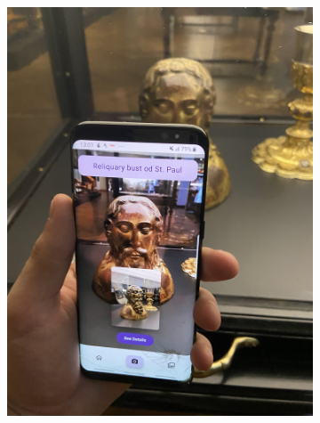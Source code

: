 \begin{figure}[h]
\begin{subfigure}[b]{0.4\textwidth}
        \includegraphics[angle=270, width=\textwidth]{img/test-example-2.jpg}
    \end{subfigure}

    \vspace{1em}


\end{figure}
